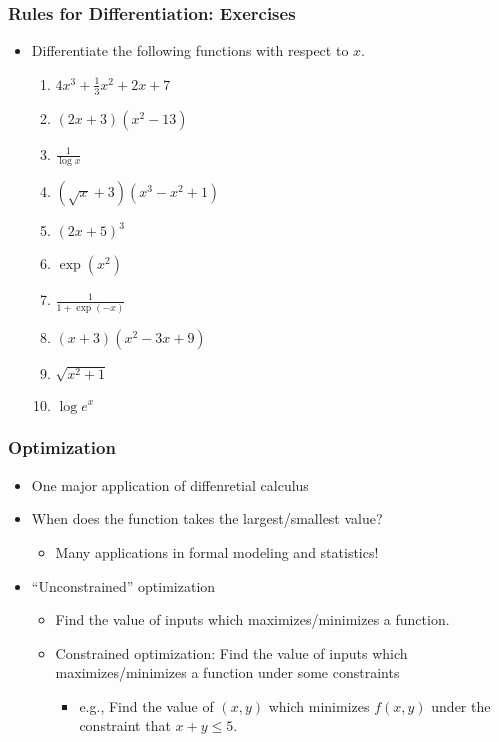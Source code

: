 \documentclass[pdflatex, 12pt]{beamer}
\begin{document}
\begin{frame}
\frametitle{Rules for Differentiation: Exercises}
\begin{itemize}
\item Differentiate the following functions with respect to $x$.
 \begin{enumerate}
 \item $4x^3 + \frac{1}{3} x^2 + 2x + 7$
 \item $(2x + 3)(x^2 - 13)$
 \vspace{0.1cm}
 \item $\frac{1}{\log x}$
 \vspace{0.1cm}
 \item $(\sqrt{x} + 3)(x^3 - x^2 + 1)$
 \item $(2x + 5)^3$
 \item $\exp(x^2)$
 \vspace{0.1cm}
 \item $\frac{1}{1 + \exp(-x)}$
 \vspace{0.1cm}
 \item $(x + 3)(x^2 - 3x + 9)$
 \item $\sqrt{x^2 + 1}$
 \item $\log e^x$
 \end{enumerate}
\end{itemize}
\end{frame}

\begin{frame}
\frametitle{Optimization}
\begin{itemize}
\item One major application of diffenretial calculus
\vspace{0.4cm}
\item When does the function takes the largest/smallest value?
 \begin{itemize}
 \item Many applications in formal modeling and statistics!
 \end{itemize}
\vspace{0.4cm}
\item ``Unconstrained'' optimization
 \begin{itemize}
 \item Find the value of inputs which maximizes/minimizes a function.
 \item Constrained optimization: Find the value of inputs which maximizes/minimizes a function under some constraints
  \begin{itemize}
  \item e.g., Find the value of $(x, y)$ which minimizes $f(x, y)$ under the constraint that $x + y \leq 5$.
  \end{itemize}
 \end{itemize}
\end{itemize}
\end{frame}
\end{document}
